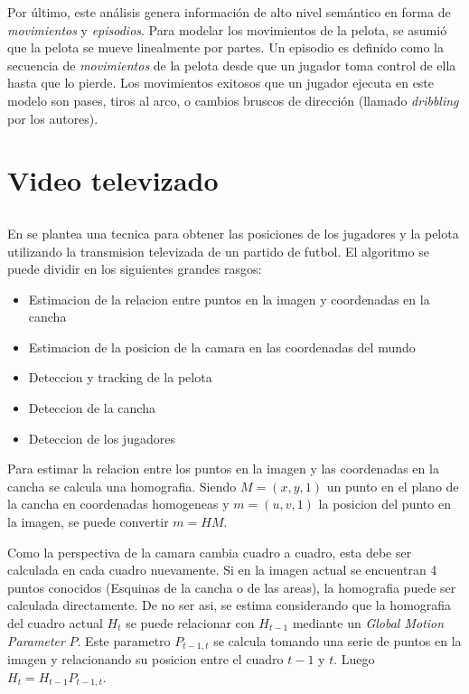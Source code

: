\documentclass[a4paper,10pt]{article}
\begin{document}
Por último, este análisis genera información de alto nivel semántico en forma de \textit{movimientos}
y \textit{episodios}. Para modelar los movimientos de la pelota, se asumió que la pelota se mueve linealmente por partes.
Un episodio es definido como la secuencia de \textit{movimientos} de la pelota desde que un jugador toma control
de ella hasta que lo pierde. Los movimientos exitosos que un jugador ejecuta en este modelo son pases, tiros al arco,
o cambios bruscos de dirección (llamado \textit{dribbling} por los autores).

\section{Video televizado}

\subsection{}

En \cite{LIU20061146} se plantea una tecnica para obtener las posiciones de los jugadores y la pelota utilizando la transmision televizada de un partido de futbol.
El algoritmo se puede dividir en los siguientes grandes rasgos:
\begin{itemize}
\item Estimacion de la relacion entre puntos en la imagen y coordenadas en la cancha
\item Estimacion de la posicion de la camara en las coordenadas del mundo
\item Deteccion y tracking de la pelota
\item Deteccion de la cancha
\item Deteccion de los jugadores
\end{itemize}

Para estimar la relacion entre los puntos en la imagen y las coordenadas en la cancha se calcula una homografia.
Siendo $M = (x, y, 1)$ un punto en el plano de la cancha en coordenadas homogeneas y $m = (u, v, 1)$ la posicion del punto en la imagen, se puede convertir $ m = H M $.

Como la perspectiva de la camara cambia cuadro a cuadro, esta debe ser calculada en cada cuadro nuevamente.
Si en la imagen actual se encuentran 4 puntos conocidos (Esquinas de la cancha o de las areas), la homografia puede ser calculada directamente.
De no ser asi, se estima considerando que la homografia del cuadro actual $H_t$ se puede relacionar con $H_{t-1}$ mediante un \textit{Global Motion Parameter} $P$.
Este parametro $P_{t-1,t}$ se calcula tomando una serie de puntos en la imagen y relacionando su posicion entre el cuadro $t-1$ y $t$.
Luego $ H_t = H_{t-1} P_{t-1,t}$.
\end{document}
